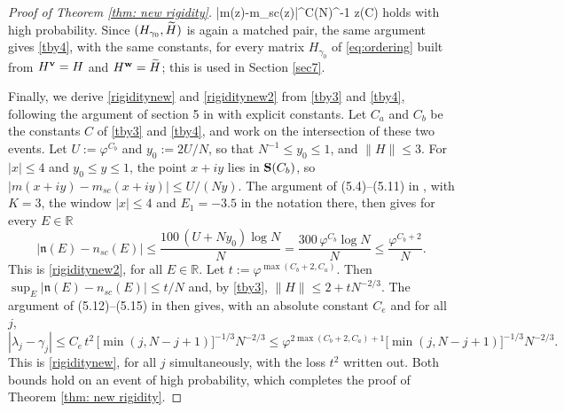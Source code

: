 \begin{proof}[Proof of Theorem \ref{thm: new rigidity}]
\be\label{tby4}
|m(z)-m_{sc}(z)|\leq\varphi^C(N\eta)^{-1}\quad {} z(C)
\ee
holds with high probability. Since $(H_{\gamma_0},\widetilde H)$ is again a matched pair, the same argument gives \eqref{tby4}, with the same constants, for every matrix $H_{\gamma_0}$ of \eqref{eq:ordering} built from $H^{\mathbf{v}}=H$ and $H^{\mathbf{w}}=\widetilde H$; this is used in Section \ref{sec7}.

Finally, we derive \eqref{rigiditynew} and \eqref{rigiditynew2} from \eqref{tby3} and \eqref{tby4}, following the argument of section 5 in \cite{EYY} with explicit constants. Let $C_a$ and $C_b$ be the constants $C$ of \eqref{tby3} and \eqref{tby4}, and work on the intersection of these two events. Let $U:=\varphi^{C_b}$ and $y_0:=2U/N$, so that $N^{-1}\le y_0\le1$, and $\|H\|\le3$. For $|x|\le4$ and $y_0\le y\le1$, the point $x+iy$ lies in ${\bf S}(C_b)$, so $|m(x+iy)-m_{sc}(x+iy)|\le U/(Ny)$. The argument of (5.4)--(5.11) in \cite{EYY}, with $K=3$, the window $|x|\le4$ and $E_1=-3.5$ in the notation there, then gives for every $E\in\mathbb R$
$$
\big|\mathfrak n(E)-n_{sc}(E)\big|\le\frac{100\,(U+Ny_0)\log N}{N}=\frac{300\,\varphi^{C_b}\log N}{N}\le\frac{\varphi^{C_b+2}}{N}.
$$
This is \eqref{rigiditynew2}, for all $E\in\mathbb R$. Let $t:=\varphi^{\max(C_b+2,C_a)}$. Then $\sup_E|\mathfrak n(E)-n_{sc}(E)|\le t/N$ and, by \eqref{tby3}, $\|H\|\le2+tN^{-2/3}$. The argument of (5.12)--(5.15) in \cite{EYY} then gives, with an absolute constant $C_e$ and for all $j$,
$$
|\lambda_j-\gamma_j|\le C_e\,t^2\,\big[\min(j,N-j+1)\big]^{-1/3}N^{-2/3}\le\varphi^{2\max(C_b+2,C_a)+1}\big[\min(j,N-j+1)\big]^{-1/3}N^{-2/3}.
$$
This is \eqref{rigiditynew}, for all $j$ simultaneously, with the loss $t^2$ written out. Both bounds hold on an event of high probability, which completes the proof of Theorem \ref{thm: new rigidity}.
\end{proof}



